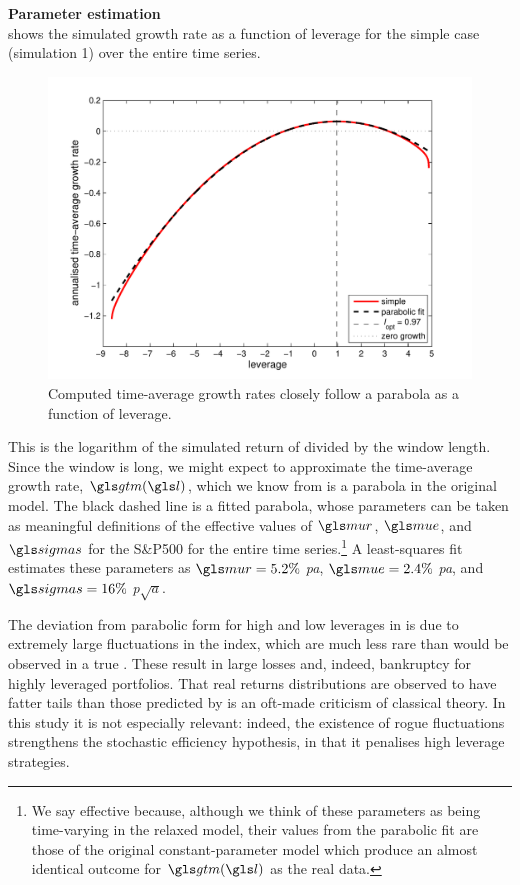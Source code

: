 \textbf{Parameter estimation}\\
 shows the simulated growth rate as a function of leverage for the simple case (simulation 1) over the entire time series.
\begin{figure}
\centering
\includegraphics[width=\textwidth]{./chapter_4/figs/sme_fig2.pdf}
\caption{Computed time-average growth rates closely follow a parabola as a function of leverage.}
\end{figure}
This is the logarithm of the simulated return of  divided by the window length. Since the window is long, we might expect to approximate the time-average growth rate, $\gtm(\l)$, which we know from  is a parabola in the original \GBM model. The black dashed line is a fitted parabola, whose parameters can be taken as meaningful definitions of the effective values of $\mur$, $\mue$, and $\sigmas$ for the S\&P500 for the entire time series.\footnote{We say effective because, although we think of these parameters as being time-varying in the relaxed model, their values from the parabolic fit are those of the original constant-parameter model which produce an almost identical outcome for $\gtm(\l)$ as the real data.} A least-squares fit estimates these parameters as $\mur=5.2\%$ \textit{pa}, $\mue=2.4\%$ \textit{pa}, and $\sigmas=16\%$ \textit{p$\sqrt{\mathit{a}}$}.

The deviation from parabolic form for high and low leverages in  is due to extremely large fluctuations in the index, which are much less rare than would be observed in a true \GBM. These result in large losses and, indeed, bankruptcy for highly leveraged portfolios. That real returns distributions are observed to have fatter tails than those predicted by \GBM is an oft-made criticism of classical theory. In this study it is not especially relevant: indeed, the existence of rogue fluctuations strengthens the stochastic efficiency hypothesis, in that it penalises high leverage strategies.


